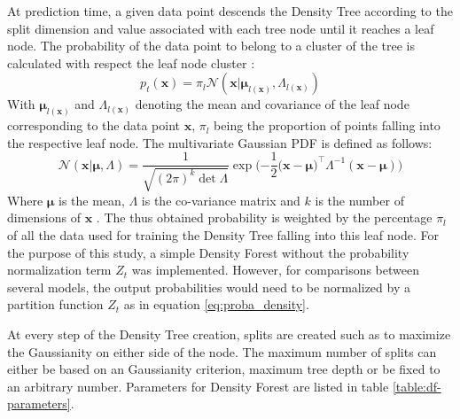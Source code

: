 \documentclass[10pt]{article}
\begin{document}
At prediction time, a given data point descends the Density Tree according to the split dimension and value associated with each tree node until it reaches a leaf node. The probability of the data point to belong to a cluster of the tree is calculated with respect the leaf node cluster \cite{decisionForests-MSR}:
\begin{equation}
    \label{eq:proba_density}
    p_t(\mathbf{x}) = \pi_l\mathcal{N}(\mathbf{x}|\boldsymbol{\mu}_{l(\mathbf{x})},\mathtt{\Lambda}_{l(\mathbf{x})})
\end{equation}
With $\boldsymbol{\mu}_{l(\mathbf{x})}$ and $\mathtt{\Lambda}_{l(\mathbf{x})}$ denoting the mean and covariance of the leaf node corresponding to the data point $\mathbf{x}$, $\pi_l$ being the proportion of points falling into the respective leaf node. The multivariate Gaussian \acrfull{PDF} is defined as follows:
\begin{equation}
    \label{eq:mv-gaussian}
    \mathcal{N}(\mathbf{x}|\boldsymbol{\mu},\mathtt{\Lambda})=\frac{1}{\sqrt{(2\pi)^k\det\mathtt{\Lambda}}}\exp\Big({-\frac{1}{2}(\mathbf{x}-\boldsymbol{\mu}})^\top\mathtt{\Lambda}^{-1}(\mathbf{x}-\boldsymbol{\mu})\Big)
\end{equation}
Where $\boldsymbol{\mu}$ is the mean, $\mathtt{\Lambda}$ is the co-variance matrix and $k$ is the number of dimensions of $\mathbf{x}$ \cite{scipy}. The thus obtained probability is weighted by the percentage $\pi_l$ of all the data used for training the Density Tree falling into this leaf node. For the purpose of this study, a simple Density Forest without the probability normalization term $Z_t$ was implemented. However, for comparisons between several models, the output probabilities would need to be normalized by a partition function $Z_t$ as in equation \ref{eq:proba_density}.

At every step of the Density Tree creation, splits are created such as to maximize the Gaussianity on either side of the node. The maximum number of splits can either be based on an Gaussianity criterion, maximum tree depth or be fixed to an arbitrary number. Parameters for Density Forest are listed in table \ref{table:df-parameters}.
\end{document}
